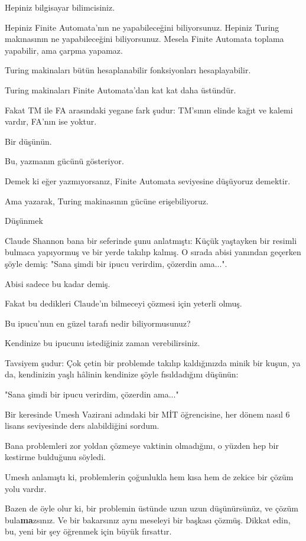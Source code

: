\documentclass[12pt,fleqn]{article}\usepackage{../../common}
\begin{document}
Hepiniz bilgisayar bilimcisiniz.

Hepiniz Finite Automata'nın ne yapabileceğini biliyorsunuz. Hepiniz Turing
makınasının ne yapabileceğini biliyorsunuz. Mesela Finite Automata toplama
yapabilir, ama çarpma yapamaz.

Turing makinaları bütün hesaplanabilir fonksiyonları hesaplayabilir.

Turing makinaları Finite Automata'dan kat kat daha üstündür.

Fakat TM ile FA arasındaki yegane fark şudur: TM'sının elinde kağıt ve
kalemi vardır, FA'nın ise yoktur.

Bir düşünün.

Bu, yazmanın gücünü gösteriyor.

Demek ki eğer yazmıyorsanız, Finite Automata seviyesine düşüyoruz demektir.

Ama yazarak, Turing makinasının gücüne erişebiliyoruz.

Düşünmek

Claude Shannon bana bir seferinde şunu anlatmıştı: Küçük yaştayken bir
resimli bulmaca yapıyormuş ve bir yerde takılıp kalmış. O sırada abisi
yanından geçerken şöyle demiş: "Sana şimdi bir ipucu verirdim, çözerdin
ama...".

Abisi sadece bu kadar demiş.

Fakat bu dedikleri Claude'ın bilmeceyi çözmesi için yeterli olmuş.

Bu ipucu'nun en güzel tarafı nedir biliyormusunuz?

Kendinize bu ipucunu istediğiniz zaman verebilirsiniz.

Tavsiyem şudur: Çok çetin bir problemde takılıp kaldığınızda minik bir
kuşun, ya da, kendinizin yaşlı hâlinin kendinize şöyle fısıldadığını
düşünün:

"Sana şimdi bir ipucu verirdim, çözerdin ama..."

Bir keresinde Umesh Vazirani adındaki bir MİT öğrencisine, her dönem nasıl
6 lisans seviyesinde ders alabildiğini sordum.

Bana problemleri zor yoldan çözmeye vaktinin olmadığını, o yüzden hep bir
kestirme bulduğunu söyledi.

Umesh anlamıştı ki, problemlerin çoğunlukla hem kısa hem de zekice bir
çözüm yolu vardır.

Bazen de öyle olur ki, bir problemin üstünde uzun uzun düşünürsünüz, ve
çözüm bula\textbf{ma}zsınız. Ve bir bakarsınız aynı meseleyi bir başkası
çözmüş. Dikkat edin, bu, yeni bir şey öğrenmek için büyük fırsattır.
\end{document}
